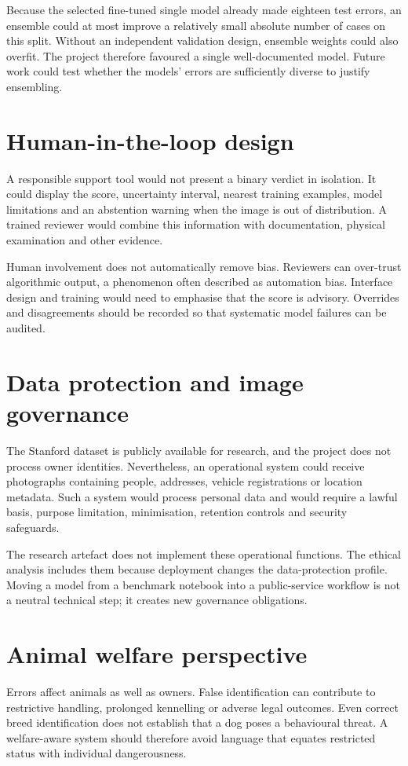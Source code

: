 Because the selected fine-tuned single model already made eighteen test errors, an ensemble could at most improve a relatively small absolute number of cases on this split. Without an independent validation design, ensemble weights could also overfit. The project therefore favoured a single well-documented model. Future work could test whether the models' errors are sufficiently diverse to justify ensembling.

\section{Human-in-the-loop design}
A responsible support tool would not present a binary verdict in isolation. It could display the score, uncertainty interval, nearest training examples, model limitations and an abstention warning when the image is out of distribution. A trained reviewer would combine this information with documentation, physical examination and other evidence.

Human involvement does not automatically remove bias. Reviewers can over-trust algorithmic output, a phenomenon often described as automation bias. Interface design and training would need to emphasise that the score is advisory. Overrides and disagreements should be recorded so that systematic model failures can be audited.

\section{Data protection and image governance}
The Stanford dataset is publicly available for research, and the project does not process owner identities. Nevertheless, an operational system could receive photographs containing people, addresses, vehicle registrations or location metadata. Such a system would process personal data and would require a lawful basis, purpose limitation, minimisation, retention controls and security safeguards.

The research artefact does not implement these operational functions. The ethical analysis includes them because deployment changes the data-protection profile. Moving a model from a benchmark notebook into a public-service workflow is not a neutral technical step; it creates new governance obligations.

\section{Animal welfare perspective}
Errors affect animals as well as owners. False identification can contribute to restrictive handling, prolonged kennelling or adverse legal outcomes. Even correct breed identification does not establish that a dog poses a behavioural threat. A welfare-aware system should therefore avoid language that equates restricted status with individual dangerousness.

